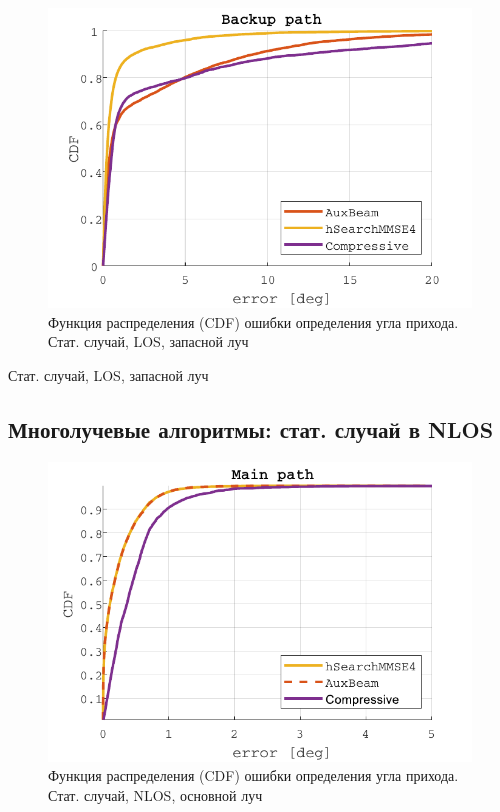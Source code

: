 \begin{figure}[H]
  \centering
  \includegraphics{results/rus/multipath-static-LOS-2}
  \caption{Функция распределения (CDF) ошибки определения угла прихода. Стат. случай, LOS, запасной луч}
  \label{fig:multipath:static:LOS:2}
\end{figure}
\begin{table}[H]
  \begin{center}
    \caption{Стат. случай, LOS, запасной луч}
    \label{tab:multipath:static:LOS:2}
  \end{center}
\end{table}

\subsection{Многолучевые алгоритмы: стат. случай в NLOS }
\begin{figure}[H]
  \centering
  \includegraphics{results/rus/multipath-static-NLOS-1}
  \caption{Функция распределения (CDF) ошибки определения угла прихода. Стат. случай, NLOS, основной луч}
  \label{fig:multipath:static:NLOS:1}
\end{figure}

